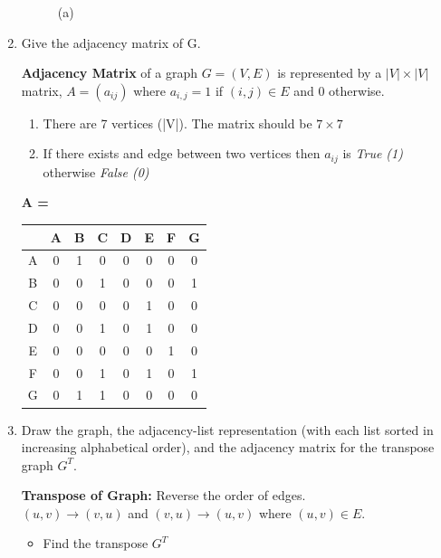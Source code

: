 \documentclass[11pt,fleqn]{book}
\begin{document}
\begin{enumerate}[label=(\alph*)]
\begin{figure}[H]
        \caption{(a)}
        \label{fig:my_label}
    \end{figure}
    \item Give the adjacency matrix of G. 
    \vspace{1em}
    \begin{definition}
    \textbf{Adjacency Matrix} of a graph $G = (V,E)$ is represented by a $|V|\times|V|$ matrix, $A = (a_{ij})$ where $a_{i,j} = 1$ if $(i,j) \in E$ and 0 otherwise. 
    \end{definition}
   \begin{enumerate}[label=(\arabic*)]
       \item There are 7 vertices (|V|). The matrix should be $7\times7$
       \item If there exists and edge between two vertices then $a_{ij}$ is \textit{True (1)} otherwise \textit{False (0)} 
   \end{enumerate}
   \begin{center}
  \lettrine[findent=2pt]{\textbf{A = }}{ } 
   \begin{tabular}{c|c c c c c c c}
       & A & B & C & D & E & F & G \\
      \hline 
    A & 0 & 1 & 0 & 0 & 0 & 0 & 0 \\
    B & 0 & 0 & 1 & 0 & 0 & 0 & 1\\
    C & 0 & 0 & 0 & 0 & 1 & 0 & 0\\
    D & 0 & 0 & 1 & 0 & 1 & 0 & 0 \\
    E & 0 & 0 & 0 & 0 & 0 & 1 & 0\\
    F & 0 & 0 & 1 & 0 & 1 & 0 & 1\\
    G & 0 & 1 & 1 & 0 & 0 & 0 & 0\\
   \end{tabular}
   \end{center}
   \item Draw the graph, the adjacency-list representation (with each list sorted in increasing alphabetical order), and the adjacency matrix for the transpose graph $G^T$.
   \begin{definition}
   \textbf{Transpose of Graph: } Reverse the order of edges. \\
   $(u,v) \rightarrow (v,u)$ and $(v,u) \rightarrow (u,v)$ where $(u,v) \in E$. 
   \end{definition}
   \begin{itemize}
       \item Find the transpose $G^T$ 
       \begin{figure}[H]
       \centering

\end{figure}
\end{itemize}
\end{enumerate}
\end{document}
